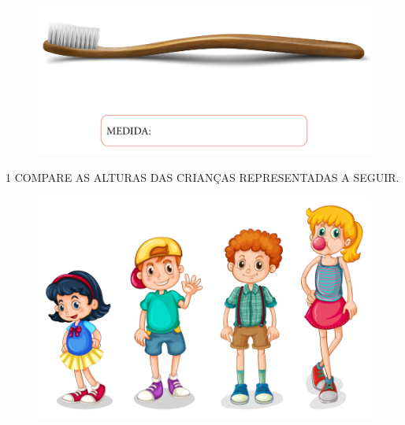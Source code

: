\begin{figure}[htpb!]
\centering
\includegraphics[width=.7\textwidth]{../ilustracoes/MAT1/SAEB_1ANO_MAT_FIGURA42.png}
\end{figure}


\pagebreak
{}

\num{1} COMPARE AS ALTURAS DAS CRIANÇAS REPRESENTADAS A SEGUIR.


\begin{figure}[htpb!]
\centering
\includegraphics[width=\textwidth]{../ilustracoes/MAT1/SAEB_1ANO_MAT_FIGURA43.png}
\end{figure}

